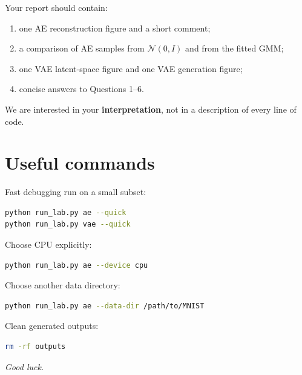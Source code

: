 \documentclass[11pt,a4paper]{article}
\begin{document}
Your report should contain:
\begin{enumerate}
  \item one AE reconstruction figure and a short comment;
  \item a comparison of AE samples from $\mathcal N(0,I)$ and from the fitted GMM;
  \item one VAE latent-space figure and one VAE generation figure;
  \item concise answers to Questions 1--6.
\end{enumerate}

We are interested in your \textbf{interpretation}, not in a description of every line of code.

\section*{Useful commands}

Fast debugging run on a small subset:

\begin{lstlisting}[language=bash]
python run_lab.py ae --quick
python run_lab.py vae --quick
\end{lstlisting}

Choose CPU explicitly:

\begin{lstlisting}[language=bash]
python run_lab.py ae --device cpu
\end{lstlisting}

Choose another data directory:

\begin{lstlisting}[language=bash]
python run_lab.py ae --data-dir /path/to/MNIST
\end{lstlisting}

Clean generated outputs:

\begin{lstlisting}[language=bash]
rm -rf outputs
\end{lstlisting}

\vfill
\begin{center}
\textit{Good luck.}
\end{center}
\end{document}
